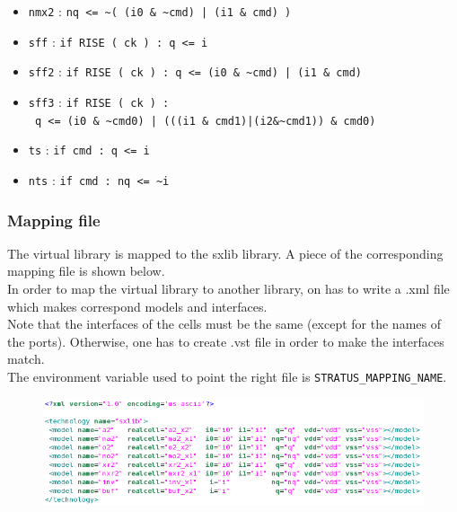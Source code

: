 \begin{itemize}
    \item \verb-nmx2- : \verb-nq <= ~( (i0 & ~cmd) | (i1 & cmd) )-
    \item \verb-sff- : \verb-if RISE ( ck ) : q <= i-
    \item \verb-sff2- : \verb-if RISE ( ck ) : q <= (i0 & ~cmd) | (i1 & cmd)-
    \item \verb-sff3- : \verb-if RISE ( ck ) :-\\\verb- q <= (i0 & ~cmd0) | (((i1 & cmd1)|(i2&~cmd1)) & cmd0)-
    \item \verb-ts- : \verb-if cmd : q <= i-
    \item \verb-nts- : \verb-if cmd : nq <= ~i-
\end{itemize}

\subsubsection{Mapping file}

The virtual library is mapped to the sxlib library. A piece of the corresponding mapping file is shown below.\\
\indent In order to map the virtual library to another library, on has to write a .xml file which makes correspond models and interfaces.\\
\indent Note that the interfaces of the cells must be the same (except for the names of the ports). Otherwise, one has to create .vst file in order to make the interfaces match.\\

\indent The environment variable used to point the right file is \verb-STRATUS_MAPPING_NAME-.

\begin{figure}[hbtp]
\centering
{}
          {\includegraphics[width=\textwidth]{images/xml.png}}
\end{figure}

